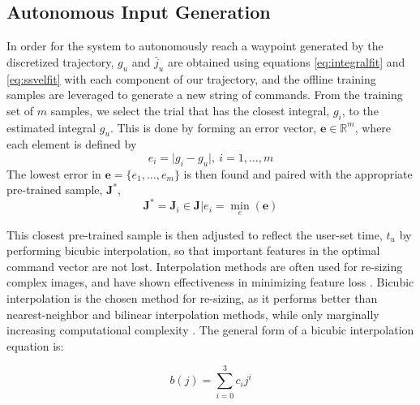 \documentclass[letterpaper, 10 pt, conference]{ieeeconf}  %
\newcommand\NB[1]{$\spadesuit$\footnote{NB: #1}}
\newcommand{\R}{\mathbb{R}}
\begin{document}
\subsection{Autonomous Input Generation} \label{sec:generate}

In order for the system to autonomously reach a waypoint generated by the discretized trajectory, %
$g_u$ and $\bar{j}_u$ are obtained using equations \eqref{eq:integralfit} and \eqref{eq:ssvelfit} with each component of our trajectory, and the offline training samples are leveraged to generate a new string of commands. From the training set of $m$ samples, we select the trial that has the closest integral, $g_i$, to the estimated integral $g_u$. This is done by forming an error vector, $\bm{e}\in\R^{m}$, where each element is defined by
\begin{equation}
 e_i = \vert g_i-g_u \vert , ~i= 1,\ldots,m
\end{equation}
 The lowest error in $\bm{e} = \{e_1,\ldots,e_m\}$ is then found and paired with the appropriate pre-trained sample, $\bm{J}^*$, %
\begin{equation}
\bm{J}^* = \bm{J}_i \in \bm{J}\vert e_i = \min_e(\bm{e})
\end{equation}

This closest pre-trained sample is then adjusted to reflect the user-set time, $t_u$ by performing bicubic interpolation, so that important features in the optimal command vector are not lost. Interpolation methods are often used for re-sizing complex images, and have shown effectiveness in minimizing feature loss \cite{bicfeatures}. Bicubic interpolation is the chosen method for re-sizing, as it performs better than nearest-neighbor and bilinear interpolation methods, while only marginally increasing computational complexity \cite{biccomp}. The general form of a bicubic interpolation equation is: 

\begin{equation} \label{eq:bicinter}
    b(j) = \sum_{i=0}^3c_ij^i
\end{equation}
\end{document}
